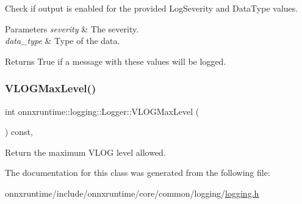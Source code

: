 Check if output is enabled for the provided Log\+Severity and Data\+Type values. 
\begin{DoxyParams}{Parameters}
{\em severity} & The severity. \\
\hline
{\em data\+\_\+type} & Type of the data. \\
\hline
\end{DoxyParams}
\begin{DoxyReturn}{Returns}
True if a message with these values will be logged. 
\end{DoxyReturn}
\mbox{\label{classonnxruntime_1_1logging_1_1Logger_af2e3439096494a094a9780eb2e238c95}} 
\subsubsection{\texorpdfstring{V\+L\+O\+G\+Max\+Level()}{VLOGMaxLevel()}}
{\footnotesize\ttfamily int onnxruntime\+::logging\+::\+Logger\+::\+V\+L\+O\+G\+Max\+Level (\begin{DoxyParamCaption}{ }\end{DoxyParamCaption}) const\hspace{0.3cm}{\ttfamily [inline]}, {\ttfamily [noexcept]}}

Return the maximum V\+L\+OG level allowed. 

The documentation for this class was generated from the following file\+:\begin{DoxyCompactItemize}
\item 
onnxruntime/include/onnxruntime/core/common/logging/\mbox{\hyperlink{logging_8h}{logging.\+h}}\end{DoxyCompactItemize}
